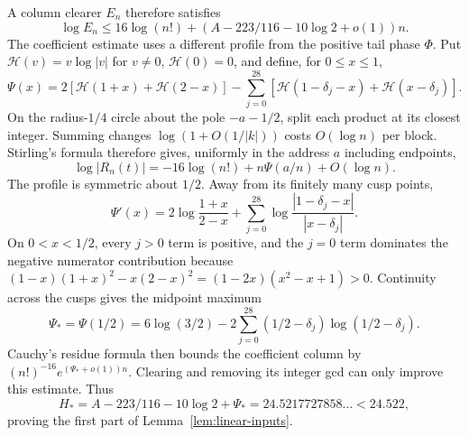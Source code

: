 A column clearer $E_n$ therefore satisfies
\[
 \log E_n\leq16\log(n!)+(A-223/116-10\log2+o(1))n.
\]
The coefficient estimate uses a different profile from the positive
tail phase $\Phi$. Put $\mathcal H(v)=v\log|v|$ for $v\ne0$,
$\mathcal H(0)=0$, and define, for $0\leq x\leq1$,
\[
 \Psi(x)=2[\mathcal H(1+x)+\mathcal H(2-x)]
 -\sum_{j=0}^{28}
       [\mathcal H(1-\delta_j-x)+\mathcal H(x-\delta_j)].
\]
On the radius-$1/4$ circle about the pole $-a-1/2$, split each product
at its closest integer. Summing changes $\log(1+O(1/|k|))$ costs
$O(\log n)$ per block. Stirling's formula therefore gives, uniformly
in the address $a$ including endpoints,
\[
 \log|R_n(t)|=-16\log(n!)+n\Psi(a/n)+O(\log n).
\]
The profile is symmetric about $1/2$. Away from its finitely many
cusp points,
\[
 \Psi'(x)=2\log\frac{1+x}{2-x}
 +\sum_{j=0}^{28}\log\frac{|1-\delta_j-x|}{|x-\delta_j|}.
\]
On $0<x<1/2$, every $j>0$ term is positive, and the $j=0$ term
dominates the negative numerator contribution because
$(1-x)(1+x)^2-x(2-x)^2=(1-2x)(x^2-x+1)>0$.
Continuity across the cusps gives the midpoint maximum
\[
 \Psi_*=\Psi(1/2)=6\log(3/2)-2\sum_{j=0}^{28}
                  (1/2-\delta_j)\log(1/2-\delta_j).
\]
Cauchy's residue formula then bounds the coefficient column by
$(n!)^{-16}e^{(\Psi_*+o(1))n}$. Clearing and removing its integer gcd
can only improve this estimate. Thus
\[
 H_*=A-223/116-10\log2+\Psi_*
 =24.5217727858\ldots<24.522,
\]
proving the first part of Lemma~\ref{lem:linear-inputs}.

